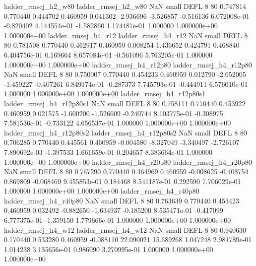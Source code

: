      ladder_rmsej_h2_w80      ladder_rmsej_h2_w80                   NaN      small     DEFL                 8 80 0.747814       0.770440 0.444702       0.460959    0.041302     -2.936696     -3.526857    -0.516136   6.072008e-01 -0.820402 4.144554e-01    -1.582860   1.174487e-01            1.000000    1.000000e+00        1.000000e+00
     ladder_rmsej_h4_r12      ladder_rmsej_h4_r12                   NaN      small     DEFL                 8 80 0.781508       0.770440 0.462917       0.460959    0.008254      1.436652      0.424791     0.468840   6.404756e-01  0.169664 8.657084e-01    -0.561096   5.763205e-01            1.000000    1.000000e+00        1.000000e+00
  ladder_rmsej_h4_r12p80   ladder_rmsej_h4_r12p80                   NaN      small     DEFL                 8 80 0.750007       0.770440 0.454233       0.460959    0.012790     -2.652005     -1.459227    -0.407261   6.849174e-01 -0.287373 7.745793e-01    -0.444911   6.576010e-01            1.000000    1.000000e+00        1.000000e+00
ladder_rmsej_h4_r12p80s1 ladder_rmsej_h4_r12p80s1                   NaN      small     DEFL                 8 80 0.758111       0.770440 0.453922       0.460959    0.021575     -1.600200     -1.526609    -0.240744   8.103775e-01 -0.308975 7.581536e-01    -0.733122   4.656537e-01            1.000000    1.000000e+00        1.000000e+00
ladder_rmsej_h4_r12p80s2 ladder_rmsej_h4_r12p80s2                   NaN      small     DEFL                 8 80 0.706285       0.770440 0.445561       0.460959   -0.004580     -8.327049     -3.340497    -2.726107   7.890692e-03 -1.397533 1.661659e-01     0.204657   8.383664e-01            1.000000    1.000000e+00        1.000000e+00
  ladder_rmsej_h4_r20p80   ladder_rmsej_h4_r20p80                   NaN      small     DEFL                 8 80 0.767290       0.770440 0.464969       0.460959   -0.008625     -0.408754      0.869809    -0.068469   9.455853e-01  0.184468 8.541187e-01     0.292590   7.706029e-01            1.000000    1.000000e+00        1.000000e+00
  ladder_rmsej_h4_r40p80   ladder_rmsej_h4_r40p80                   NaN      small     DEFL                 8 80 0.763639       0.770440 0.453423       0.460959    0.032492     -0.882650     -1.634937    -0.185200   8.535471e-01 -0.417099 6.777375e-01    -1.359150   1.779666e-01            1.000000    1.000000e+00        1.000000e+00
     ladder_rmsej_h4_w12      ladder_rmsej_h4_w12                   NaN      small     DEFL                 8 80 0.940630       0.770440 0.533280       0.460959   -0.088110     22.090021     15.689268     1.047248   2.981789e-01  1.014238 3.135656e-01     0.986090   3.270995e-01            1.000000    1.000000e+00        1.000000e+00
